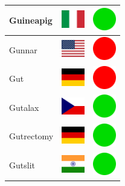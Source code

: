 \documentclass[12pt, a4paper, twoside]{report}
\begin{document}
\begin{center}
\begin{longtable}{|p{5cm}|p{2cm}|p{2cm}|}
Guineapig & \includegraphics[width=1cm]{4x3/it} & \includegraphics[width=1cm]{likes/y} \\ \hline
Gunnar & \includegraphics[width=1cm]{4x3/us} & \includegraphics[width=1cm]{likes/n} \\ \hline
Gut & \includegraphics[width=1cm]{4x3/de} & \includegraphics[width=1cm]{likes/n} \\ \hline
Gutalax & \includegraphics[width=1cm]{4x3/cz} & \includegraphics[width=1cm]{likes/y} \\ \hline
Gutrectomy & \includegraphics[width=1cm]{4x3/de} & \includegraphics[width=1cm]{likes/y} \\ \hline
Gutslit & \includegraphics[width=1cm]{4x3/in} & \includegraphics[width=1cm]{likes/y} \\ \hline

\end{longtable}
\end{center}
\end{document}
